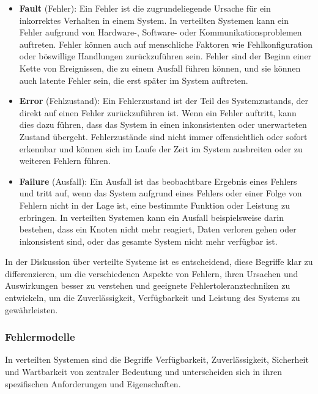 \documentclass[../vs-script-first-v01.tex]{subfiles}
\begin{document}
\begin{itemize}
\item \textbf{Fault} (Fehler): Ein Fehler ist die zugrundeliegende Ursache für ein inkorrektes Verhalten in einem System. In verteilten Systemen kann ein Fehler aufgrund von Hardware-, Software- oder Kommunikationsproblemen auftreten. Fehler können auch auf menschliche Faktoren wie Fehlkonfiguration oder böswillige Handlungen zurückzuführen sein. Fehler sind der Beginn einer Kette von Ereignissen, die zu einem Ausfall führen können, und sie können auch latente Fehler sein, die erst später im System auftreten.
\item \textbf{Error} (Fehlzustand): Ein Fehlerzustand ist der Teil des Systemzustands, der direkt auf einen Fehler zurückzuführen ist. Wenn ein Fehler auftritt, kann dies dazu führen, dass das System in einen inkonsistenten oder unerwarteten Zustand übergeht. Fehlerzustände sind nicht immer offensichtlich oder sofort erkennbar und können sich im Laufe der Zeit im System ausbreiten oder zu weiteren Fehlern führen.
\item \textbf{Failure} (Ausfall): Ein Ausfall ist das beobachtbare Ergebnis eines Fehlers und tritt auf, wenn das System aufgrund eines Fehlers oder einer Folge von Fehlern nicht in der Lage ist, eine bestimmte Funktion oder Leistung zu erbringen. In verteilten Systemen kann ein Ausfall beispielsweise darin bestehen, dass ein Knoten nicht mehr reagiert, Daten verloren gehen oder inkonsistent sind, oder das gesamte System nicht mehr verfügbar ist.
\end{itemize}
In der Diskussion über verteilte Systeme ist es entscheidend, diese Begriffe klar zu differenzieren, um die verschiedenen Aspekte von Fehlern, ihren Ursachen und Auswirkungen besser zu verstehen und geeignete Fehlertoleranztechniken zu entwickeln, um die Zuverlässigkeit, Verfügbarkeit und Leistung des Systems zu gewährleisten.


\subsubsection{Fehlermodelle}

In verteilten Systemen sind die Begriffe Verfügbarkeit, Zuverlässigkeit, Sicherheit und Wartbarkeit von zentraler Bedeutung und unterscheiden sich in ihren spezifischen Anforderungen und Eigenschaften.
\end{document}
